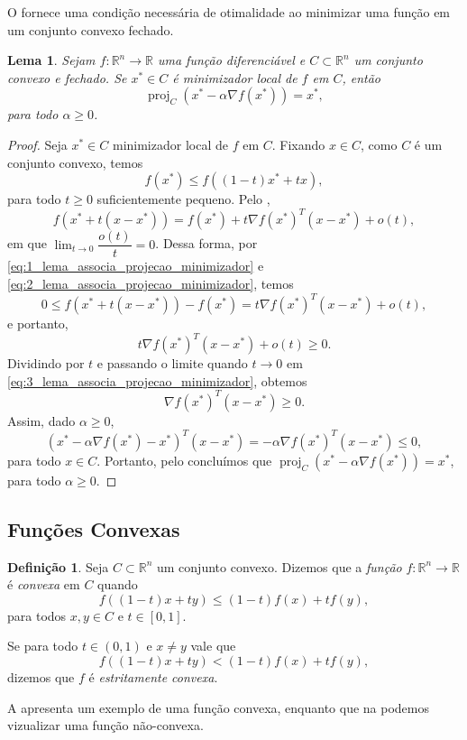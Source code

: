 \documentclass[12pt,a4paper]{scrartcl}
\DeclareMathOperator{\proj}{proj}
\def\RR{\mathds{R}}
\newtheorem{lema}{Lema}
\theoremstyle{definition}%
\newtheorem{defi}{Definição}
\begin{document}
O  fornece uma condição necessária de otimalidade ao minimizar uma função em um conjunto convexo fechado.


\begin{lema} \label{lema:associa_projecao_minimizador}
Sejam $f: \RR^{n} \rightarrow \RR$ uma função diferenciável e $C \subset \RR^{n}$ um conjunto convexo e fechado. Se $x^{*} \in C$ é minimizador local de $f$ em $C$, então
\[
\proj_{C} (x^{*} - \alpha \nabla f(x^{*})) = x^{*} ,
\]
para todo $\alpha \geq 0$.
\end{lema}
\begin{proof}
Seja $x^{*} \in C$ minimizador local de $f$ em $C$. Fixando $x\in C$, como $C$ é um conjunto convexo, temos
\[ \label{eq:1_lema_associa_projecao_minimizador}
f(x^{*}) \leq f((1-t)x^{*} + tx),
\]
para todo $t\geq 0$ suficientemente pequeno. Pelo , 
\[ \label{eq:2_lema_associa_projecao_minimizador}
f(x^{*}+t(x-x^{*})) = f(x^{*}) + t\nabla f(x^{*})^{T}(x-x^{*}) + o(t) ,
\]
em que $\lim_{t\rightarrow 0} \dfrac{o(t)}{t} = 0$. Dessa forma, por \eqref{eq:1_lema_associa_projecao_minimizador} e \eqref{eq:2_lema_associa_projecao_minimizador}, temos
\[
0 \leq f(x^{*}+t(x-x^{*})) - f(x^{*}) = t\nabla f(x^{*})^{T}(x-x^{*}) + o(t) ,
\]
e portanto, 
\[ \label{eq:3_lema_associa_projecao_minimizador}
t\nabla f(x^{*})^{T}(x-x^{*}) + o(t) \geq 0.
\]
Dividindo por $t$ e passando o limite quando $t \rightarrow 0$ em \eqref{eq:3_lema_associa_projecao_minimizador}, obtemos
\[
\nabla f(x^{*})^{T}(x-x^{*}) \geq 0.
\]
Assim, dado $\alpha \geq 0$,
\[
(x^{*} - \alpha \nabla f(x^{*}) - x^{*})^{T}(x-x^{*}) = -\alpha \nabla f(x^{*})^{T}(x-x^{*}) \leq 0,
\]
para todo $x\in C$. Portanto, pelo  concluímos que $\proj_{C} (x^{*} - \alpha \nabla f(x^{*})) = x^{*}$, para todo $\alpha \geq 0$.
\end{proof}




\subsection{Funções Convexas}

\begin{defi} \label{defi:funcao_convexa}
Seja $C \subset \RR^{n}$ um conjunto convexo. Dizemos que a \emph{função} $f: \RR^{n} \rightarrow \RR$ é \emph{convexa} em $C$ quando
\[
f((1-t)x + ty) \leq (1-t)f(x) + tf(y),
\]
para todos $x,y \in C$ e $t \in [0,1]$.

Se para todo $t \in (0,1)$ e $x \neq y$ vale que
\[
f((1-t)x + ty) < (1-t)f(x) + tf(y),
\]
dizemos que $f$ é \emph{estritamente convexa}.
\end{defi}
A  apresenta um exemplo de uma função convexa, enquanto que na  podemos vizualizar uma função não-convexa.
\end{document}
